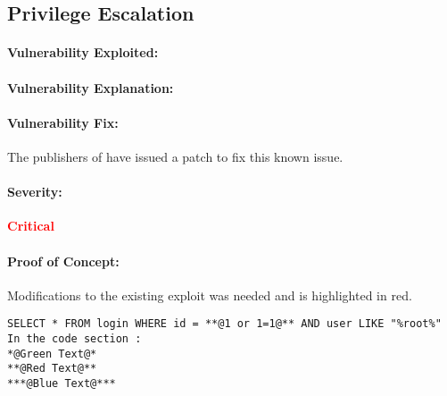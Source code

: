 \ifdefined\root

\subsection{Privilege Escalation}

\paragraph{Vulnerability Exploited:}
\vulnx

\paragraph{Vulnerability Explanation:}


\paragraph{Vulnerability Fix:}
The publishers of \product{} have issued a patch to fix this known issue.

\paragraph{Severity:}
\textbf{\textcolor{red}{Critical}}

\paragraph{Proof of Concept:} 
Modifications to the existing exploit was needed and is highlighted in red.
\begin{lstlisting}[caption={Exploitation of \hostname}]
SELECT * FROM login WHERE id = **@1 or 1=1@** AND user LIKE "%root%"
In the code section :
*@Green Text@*
**@Red Text@**
***@Blue Text@***
\end{lstlisting}

